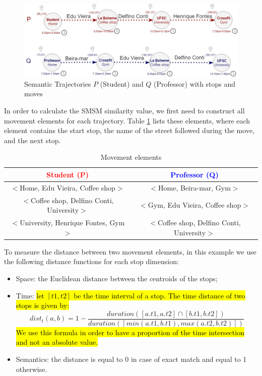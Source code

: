 \documentclass[12pt]{article}
\begin{document}
\begin{figure}[h!]
\centering
\includegraphics[width=1\textwidth]{Images/running_example.jpg}
\caption{\label{fig:bus} Semantic Trajectories $P$ (Student) and $Q$ (Professor) with stops and moves}
\end{figure}


In order to calculate the SMSM similarity value, we first need to construct all movement elements for each trajectory. Table \ref{tab:SMSM_tuples} lists these elements, where each element contains the start stop, the name of the street followed during the move, and the next stop. 

\begin{table}[h!]
\scriptsize
  \centering
  \begin{tabular}{|c|c|}
  	\hline
		\textcolor{Red}{\textbf{Student (P)}} & \textcolor{Blue}{\textbf{Professor (Q)}}\\
  	\hline
      $<$Home, Edu Vieira, Coffee shop$>$&$<$Home, Beira-mar, Gym$>$\\
      $<$Coffee shop, Delfino Conti, University$>$&$<$Gym, Edu Vieira, Coffee shop$>$\\
      $<$University, Henrique Fontes, Gym$>$&$<$Coffee shop, Delfino Conti, University$>$\\
  	\hline
  \end{tabular}
  \label{tab:wrong}
  \caption{Movement elements}
  \label{tab:SMSM_tuples}
\end{table}

To measure the distance between two movement elements, in this example we use the following distance functions for each stop dimension:
\begin{itemize}
  \item Space: the Euclidean distance between the centroids of the stops;
      \item  Time:  \hl{let $[t1, t2]$ be the time interval of a stop. The time distance of two stops is given by:}
\begin{equation} \label{func:time_interval}
	dist_t(a, b) = 1 - \dfrac{duration([a.t1, a.t2] \cap [b.t1, b.t2])}{duration([min(a.t1, b.t1), max(a.t2, b.t2)])}
\end{equation}
\hl{We use this formula in order to have a proportion of the time intersection and not an absolute value.}
  \item Semantics: the distance is equal to 0 in case of exact match and equal to 1 otherwise.
\end{itemize}
\end{document}
